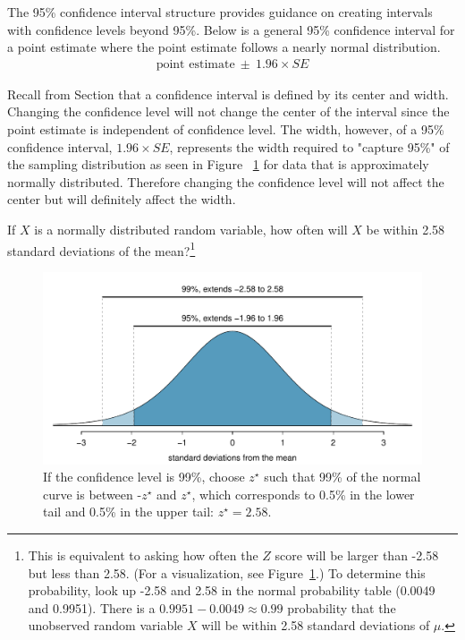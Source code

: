 The 95\% confidence interval structure provides guidance on creating intervals with confidence levels beyond 95\%. Below is a general 95\% confidence interval for a point estimate where the point estimate follows a nearly normal distribution.
\begin{eqnarray}
\text{point estimate}\ \pm\ 1.96\times SE
\end{eqnarray}

Recall from Section \label{calculate95confidence} that a confidence interval is defined by its center and width. Changing the confidence level will not change the center of the interval since the point estimate is independent of confidence level. The width, however, of a 95\% confidence interval, $1.96\times SE$, represents the width required to "capture 95\%" of the sampling distribution as seen in Figure ~\ref{choosingZForCI} for data that is approximately normally distributed. Therefore changing the confidence level will not affect the center but will definitely affect the width.


\begin{exercise} \label{leadInForMakingA99PercentCIExercise}
If $X$ is a normally distributed random variable, how often will $X$ be within 2.58 standard deviations of the mean?\footnote{This is equivalent to asking how often the $Z$ score will be larger than -2.58 but less than 2.58. (For a visualization, see Figure~\ref{choosingZForCI}.) To determine this probability, look up -2.58 and 2.58 in the normal probability table (0.0049 and 0.9951). There is a $0.9951-0.0049 \approx 0.99$ probability that the unobserved random variable $X$ will be within 2.58 standard deviations of $\mu$.}
\end{exercise}

\begin{figure}
\centering
\includegraphics[width=\textwidth]{ch_inference_foundations_oi_biostat/figures/choosingZForCI/choosingZForCI}
\caption{If the confidence level is 99\%, choose $z^{\star}$ such that 99\% of the normal curve is between -$z^{\star}$ and $z^{\star}$, which corresponds to 0.5\% in the lower tail and 0.5\% in the upper tail: $z^{\star}=2.58$.}
\label{choosingZForCI}
\end{figure}


